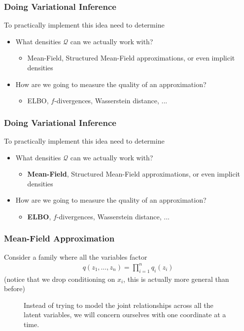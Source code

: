 \documentclass[10pt,mathserif]{beamer}
\begin{document}
\begin{frame}
  \frametitle{Doing Variational Inference}
  To practically implement this idea need to determine
  \begin{itemize}
  \item What densities $\mathcal{Q}$ can we actually work with?
    \begin{itemize}
    \item Mean-Field, Structured Mean-Field approximations, or even implicit densities
    \end{itemize}
  \item How are we going to measure the quality of an approximation?
    \begin{itemize}
    \item ELBO, $f$-divergences, Wasserstein distance, ...
    \end{itemize}
  \end{itemize}
\end{frame}

\begin{frame}
  \frametitle{Doing Variational Inference}
  To practically implement this idea need to determine
  \begin{itemize}
  \item What densities $\mathcal{Q}$ can we actually work with?
    \begin{itemize}
    \item \textbf{Mean-Field}, Structured Mean-Field approximations, or even implicit densities
    \end{itemize}
  \item How are we going to measure the quality of an approximation?
    \begin{itemize}
    \item \textbf{ELBO}, $f$-divergences, Wasserstein distance, ...
    \end{itemize}
  \end{itemize}
\end{frame}

\begin{frame}
  \frametitle{Mean-Field Approximation}
  Consider a family where all the variables factor
  \begin{align*}
    q\left(z_1, \dots, z_n\right) = \prod_{i = 1}^{n} q_{i}\left(z_i\right)
  \end{align*}
  (notice that we drop conditioning on $x_i$, this is actually more general than
  before)
\begin{figure}[ht]
  \centering
  \begin{subfigure}
    \texttt{[image: figure/variational\_multidimensional\_q]}
  \end{subfigure}
  \begin{subfigure}
    \texttt{[image: figure/variational\_univariate\_q]}
  \end{subfigure}
  \caption{Instead of trying to model the joint relationships across all the
    latent variables, we will concern ourselves with one coordinate at a
    time. \label{fig:variational_multidimensional_q}}
\end{figure}
\end{frame}
\end{document}
